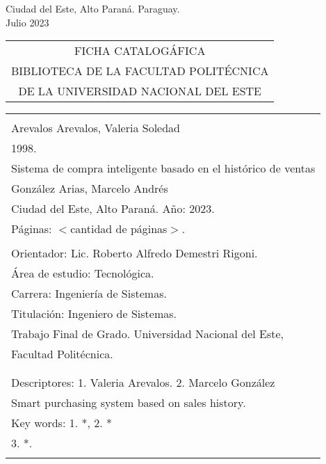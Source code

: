\begin{center}
{\large Ciudad del Este, Alto Paraná. Paraguay.\\[6mm]
Julio 2023}
\end{center}
\newpage \normalsize
\thispagestyle{empty}
\begin{center} 
\begin{tabular}{c} 
  FICHA CATALOGÁFICA \\
  BIBLIOTECA DE LA FACULTAD POLITÉCNICA \\
  DE LA UNIVERSIDAD NACIONAL DEL ESTE \\
\end{tabular} %
\vspace{0.3cm}
\begin{tabular}{|l|} \hline %
  \\
  Arevalos Arevalos, Valeria Soledad\\
   1998.\\
   Sistema de compra inteligente basado en el histórico de ventas  \\
  González Arias, Marcelo Andrés\\
  Ciudad del Este, Alto Paraná. Año: 2023.\\
  Páginas: $<$cantidad de páginas$>$.\\ 
  \\
  Orientador: Lic. Roberto Alfredo Demestri Rigoni. \\
  
  Área de estudio: Tecnológica. \\
  Carrera: Ingeniería de Sistemas. \\
  Titulación: Ingeniero de Sistemas. \\
  
  Trabajo Final de Grado. Universidad Nacional del Este, \\
  Facultad Politécnica.\\
  \\ \\
  
  Descriptores: 1. Valeria Arevalos. 2. Marcelo González\\
  Smart purchasing system based on sales history. \\
  Key words: 1. *, 2. * \\
  \hspace{2cm} 3. *.\\
  \\
  \hline

\end{tabular}
\end{center}

